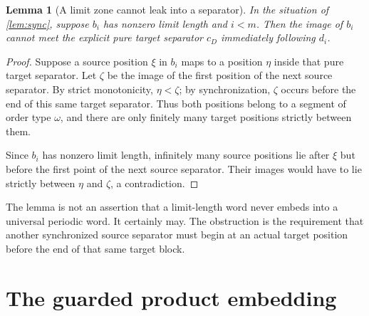 \documentclass[11pt]{article}
\numberwithin{equation}{section}
\theoremstyle{plain}
\newtheorem{lemma}[lemma]{Lemma}
\theoremstyle{definition}
\theoremstyle{remark}
\begin{document}
\begin{lemma}[A limit zone cannot leak into a separator]\label{lem:noleak}
In the situation of \cref{lem:sync}, suppose $b_i$ has nonzero limit length and $i<m$. Then the image of $b_i$ cannot meet the explicit pure target separator $c_D$ immediately following $d_i$.
\end{lemma}
\begin{proof}
Suppose a source position $\xi$ in $b_i$ maps to a position $\eta$ inside that pure target separator. Let $\zeta$ be the image of the first position of the next source separator. By strict monotonicity, $\eta<\zeta$; by synchronization, $\zeta$ occurs before the end of this same target separator. Thus both positions belong to a segment of order type $\omega$, and there are only finitely many target positions strictly between them.

Since $b_i$ has nonzero limit length, infinitely many source positions lie after $\xi$ but before the first point of the next source separator. Their images would have to lie strictly between $\eta$ and $\zeta$, a contradiction.
\end{proof}

The lemma is not an assertion that a limit-length word never embeds into a universal periodic word. It certainly may. The obstruction is the requirement that another synchronized source separator must begin at an actual target position before the end of that same target block.

\section{The guarded product embedding}\label{sec:product}
\end{document}
